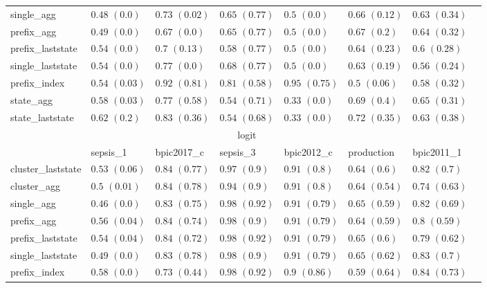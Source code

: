 \documentclass[twoside,11pt]{Latex/Classes/PhDthesisPSnPDF}
\begin{document}
\begin{table}[h]
{\begin{tabular}{llllllll}
			single\_agg & $0.48$ ${(0.0)}$ & $0.73$ ${(0.02)}$ & $0.65$ ${(0.77)}$ & $0.5$ ${(0.0)}$ & $0.66$ ${(0.12)}$ & $0.63$ ${(0.34)}$ \\
			prefix\_agg & $0.49$ ${(0.0)}$ & $0.67$ ${(0.0)}$ & $0.65$ ${(0.77)}$ & $0.5$ ${(0.0)}$ & $0.67$ ${(0.2)}$ & $0.64$ ${(0.32)}$ \\
			prefix\_laststate & $0.54$ ${(0.0)}$ & $0.7$ ${(0.13)}$ & $0.58$ ${(0.77)}$ & $0.5$ ${(0.0)}$ & $0.64$ ${(0.23)}$ & $0.6$ ${(0.28)}$ \\
			single\_laststate & $0.54$ ${(0.0)}$ & $0.77$ ${(0.0)}$ & $0.68$ ${(0.77)}$ & $0.5$ ${(0.0)}$ & $0.63$ ${(0.19)}$ & $0.56$ ${(0.24)}$ \\
			prefix\_index & $0.54$ ${(0.03)}$ & $0.92$ ${(0.81)}$ & $0.81$ ${(0.58)}$ & $0.95$ ${(0.75)}$ & $0.5$ ${(0.06)}$ & $0.58$ ${(0.32)}$ \\
			state\_agg & $0.58$ ${(0.03)}$ & $0.77$ ${(0.58)}$ & $0.54$ ${(0.71)}$ & $0.33$ ${(0.0)}$ & $0.69$ ${(0.4)}$ & $0.65$ ${(0.31)}$ \\
			state\_laststate & $0.62$ ${(0.2)}$ & $0.83$ ${(0.36)}$ & $0.54$ ${(0.68)}$ & $0.33$ ${(0.0)}$ & $0.72$ ${(0.35)}$ & $0.63$ ${(0.38)}$ \\
			\bottomrule
			\toprule
			& \multicolumn{5}{c}{logit}
			\\
			& sepsis\_1 & bpic2017\_c & sepsis\_3 & bpic2012\_c & production & bpic2011\_1
			\\ \midrule
			cluster\_laststate & $0.53$ ${(0.06)}$ & $0.84$ ${(0.77)}$ & $0.97$ ${(0.9)}$ & $0.91$ ${(0.8)}$ & $0.64$ ${(0.6)}$ & $0.82$ ${(0.7)}$ \\
			cluster\_agg & $0.5$ ${(0.01)}$ & $0.84$ ${(0.78)}$ & $0.94$ ${(0.9)}$ & $0.91$ ${(0.8)}$ & $0.64$ ${(0.54)}$ & $0.74$ ${(0.63)}$ \\
			single\_agg & $0.46$ ${(0.0)}$ & $0.83$ ${(0.75)}$ & $0.98$ ${(0.92)}$ & $0.91$ ${(0.79)}$ & $0.65$ ${(0.59)}$ & $0.82$ ${(0.69)}$ \\
			prefix\_agg & $0.56$ ${(0.04)}$ & $0.84$ ${(0.74)}$ & $0.98$ ${(0.9)}$ & $0.91$ ${(0.79)}$ & $0.64$ ${(0.59)}$ & $0.8$ ${(0.59)}$ \\
			prefix\_laststate & $0.54$ ${(0.04)}$ & $0.84$ ${(0.72)}$ & $0.98$ ${(0.92)}$ & $0.91$ ${(0.79)}$ & $0.65$ ${(0.6)}$ & $0.79$ ${(0.62)}$ \\
			single\_laststate & $0.49$ ${(0.0)}$ & $0.83$ ${(0.78)}$ & $0.98$ ${(0.9)}$ & $0.91$ ${(0.79)}$ & $0.65$ ${(0.62)}$ & $0.83$ ${(0.7)}$ \\
			prefix\_index & $0.58$ ${(0.0)}$ & $0.73$ ${(0.44)}$ & $0.98$ ${(0.92)}$ & $0.9$ ${(0.86)}$ & $0.59$ ${(0.64)}$ & $0.84$ ${(0.73)}$ \\

\end{tabular}}
\end{table}
\end{document}
